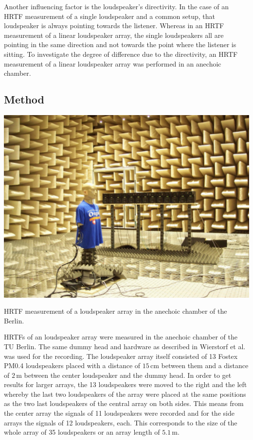 Another influencing factor is the loudspeaker's directivity.
In the case of an \ac{HRTF} measurement of a single loudspeaker and
a common setup, that
loudspeaker is always pointing towards the listener. Whereas in an \ac{HRTF}
measurement of a linear loudspeaker array, the single loudspeakers all are pointing in
the same direction and not towards the point where the listener is sitting. To
investigate the degree of difference due to the directivity, an \ac{HRTF} measurement
of a linear loudspeaker array was performed in an anechoic chamber.

\subsection{Method}
%
\begin{marginfigure}
    \includegraphics[width=\columnwidth]{fig4_05/fig4_05}
    \caption{\ac{HRTF} measurement of a loudspeaker array in the anechoic
    chamber of the  Berlin.
    }
    \label{fig:HRTF_measurement_array}
\end{marginfigure}
%
\acp{HRTF} of an loudspeaker array were measured in the anechoic chamber of
the {\small TU}
Berlin. The same dummy head and hardware as described in Wierstorf et
al.\autocite{Wierstorf2011a} was used for the recording. The loudspeaker array
itself consisted of 13 Fostex {\small PM0.4} loudspeakers placed with a distance of
$15$\,cm between them and a distance of $2$\,m between the center loudspeaker
and the dummy head. In order to get results for larger arrays, the 13
loudspeakers were moved to the right and the left whereby the last two
loudspeakers of the array were placed at the same positions as the
two last loudspeakers of the central array on both sides. This means from the center
array the signals of 11 loudspeakers were recorded and for the side arrays the
signals of 12 loudspeakers, each. This corresponds to the size
of the whole array of 35 loudspeakers or an array length of $5.1$\,m.

